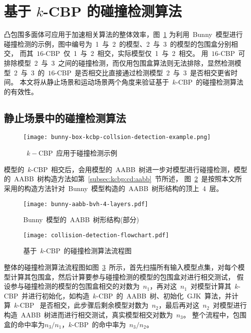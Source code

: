 \section{基于 $k$-CBP 的碰撞检测算法}
\label{sec:cd:baseon:kcbp}

凸包围多面体可应用于加速相关算法的整体效率，图~\ref{lbl:bunny-box-kcbp-collsion-detection-example}
为利用~Bunny~模型进行碰撞检测的示例，图中编号为~1~与~2~的模型、2~与~3~的模型的包围盒分别相交， 而其~$16$-CBP~仅~1~与~2~相交，实际模型仅~1~与~2~相交。
用~$16$-CBP~可排除模型~2~与~3~之间的碰撞检测，而仅用包围盒算法则无法排除，显然检测模型~2~与~3~的~$16$-CBP~是否相交比直接通过检测模型~2~与~3~是否相交更省时间。
本文将从静止场景和运动场景两个角度来验证基于~$k$-CBP~的碰撞检测算法的有效性。 

\subsection{静止场景中的碰撞检测算法}
\label{subsec:static:cd}

\begin{figure}[htb] 
\centering
\texttt{[image: bunny-box-kcbp-collsion-detection-example.png]}
\caption{~$k-$CBP~应用于碰撞检测示例}
\label{lbl:bunny-box-kcbp-collsion-detection-example}
\end{figure}

模型的~$k$-CBP~相交后，会用模型的~AABB~树进一步对模型进行碰撞检测，模型的~AABB~树构造方法如第~\ref{subsec:kcbp:cd:aabb}~节所述，
图~\ref{fig:bunny:aabb:bvh:toplayer4}~是按照本文所采用的构造方法针对~Bunny~模型构造的~AABB~树形结构的顶上~4~层。

\begin{figure}[htpb]
  \centering
  \texttt{[image: bunny-aabb-bvh-4-layers.pdf]}
  \caption{Bunny~模型的~AABB~树形结构(部分)}
  \label{fig:bunny:aabb:bvh:toplayer4}
\end{figure}

\begin{figure}[htpb]
  \centering
  \texttt{[image: collision-detection-flowchart.pdf]}
  \caption{基于~$k$-CBP~的碰撞检测算法流程图}
  \label{fig:flowchart:cd}
\end{figure}

整体的碰撞检测算法流程图如图~\ref{fig:flowchart:cd}~所示，首先扫描所有输入模型点集，对每个模型计算其包围盒，然后计算要参与碰撞检测的模型的包围盒对进行相交测试，
假设参与碰撞检测的模型的包围盒相交的对数为~$n_1$，再对这~$n_1$~对模型计算其~$k$-CBP~并进行初始化，如构造~$k$-CBP~的~AABB~树、初始化~GJK~算法，并计算~$k$-CBP~
是否相交，此步骤后剩余模型对数为~$n_2$，最后再对这~$n_2$~对模型进行构造~AABB~树进而进行相交测试，真实模型相交对数为~$n_3$。
整个流程中，包围盒的命中率为$n_3 / n_1$，$k$-CBP~的命中率为~$n_3/n_2$。

